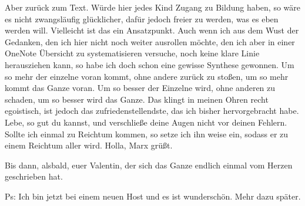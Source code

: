 Aber zurück zum Text. Würde hier jedes Kind Zugang zu Bildung haben,
so wäre es nicht zwangsläufig glücklicher, dafür jedoch freier zu
werden, was es eben werden will. Vielleicht ist das ein
Ansatzpunkt. Auch wenn ich aus dem Wust der Gedanken, den ich hier
nicht noch weiter ausrollen möchte, den ich aber in einer OneNote
Übersicht zu systematisieren versuche, noch keine klare Linie
herausziehen kann, so habe ich doch schon eine gewisse Synthese
gewonnen. Um so mehr der einzelne voran kommt, ohne andere zurück zu
stoßen, um so mehr kommt das Ganze voran. Um so besser der Einzelne
wird, ohne anderen zu schaden, um so besser wird das Ganze. Das klingt
in meinen Ohren recht egoistisch, ist jedoch das zufriedenstellendste,
das ich bisher hervorgebracht habe. Lebe, so gut du kannst, und
verschließe deine Augen nicht vor deinen Fehlern. Sollte ich einmal zu
Reichtum kommen, so setze ich ihn weise ein, sodass er zu einem
Reichtum aller wird. Holla, Marx grüßt.

Bis dann, alsbald, euer Valentin, der sich das Ganze endlich einmal
vom Herzen geschrieben hat.

Ps: Ich bin jetzt bei einem neuen Host und es ist wunderschön. Mehr
dazu später.
